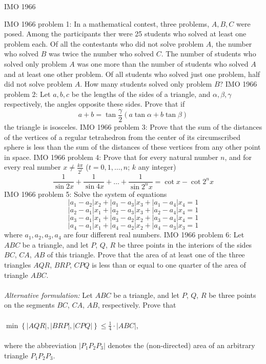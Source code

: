 IMO 1966 

IMO 1966 problem 1:  In a mathematical contest, three problems, $A,B,C$ were posed. Among the participants ther were 25 students who solved at least one problem each. Of all the contestants who did not solve problem $A$, the number who solved $B$ was twice the number who solved $C$. The number of students who solved only problem $A$ was one more than the number of students who solved $A$ and at least one other problem. Of all students who solved just one problem, half did not solve problem $A$. How many students solved only problem $B$? 
IMO 1966 problem 2:  Let $a,b,c$ be the lengths of the sides of a triangle, and $\alpha, \beta, \gamma$ respectively, the angles opposite these sides. Prove that if
\[ a+b=\tan{\frac{\gamma}{2}}(a\tan{\alpha}+b\tan{\beta}) \]
the triangle is isosceles. 
IMO 1966 problem 3:  Prove that the sum of the distances of the vertices of a regular tetrahedron from the center of its circumscribed sphere is less than the sum of the distances of these vertices from any other point in space. 
IMO 1966 problem 4:  Prove that for every natural number $n$, and for every real number $x \neq \frac{k\pi}{2^t}$ ($t=0,1, \dots, n$; $k$ any integer)
\[ \frac{1}{\sin{2x}}+\frac{1}{\sin{4x}}+\dots+\frac{1}{\sin{2^nx}}=\cot{x}-\cot{2^nx} \] 
IMO 1966 problem 5:  Solve the system of equations
\[ |a_1-a_2|x_2+|a_1-a_3|x_3+|a_1-a_4|x_4=1 \]
\[ |a_2-a_1|x_1+|a_2-a_3|x_3+|a_2-a_4|x_4=1 \]
\[ |a_3-a_1|x_1+|a_3-a_2|x_2+|a_3-a_4|x_4=1 \]
\[ |a_4-a_1|x_1+|a_4-a_2|x_2+|a_4-a_3|x_3=1 \]
where $a_1, a_2, a_3, a_4$ are four different real numbers. 
IMO 1966 problem 6:  Let $ ABC$ be a triangle, and let $ P$, $ Q$, $ R$ be three points in the interiors of the sides $ BC$, $ CA$, $ AB$ of this triangle. Prove that the area of at least one of the three triangles $ AQR$, $ BRP$, $ CPQ$ is less than or equal to one quarter of the area of triangle $ ABC$. \\\\
\textit{Alternative formulation:} Let $ ABC$ be a triangle, and let $ P$, $ Q$, $ R$ be three points on the segments $ BC$, $ CA$, $ AB$, respectively. Prove that \\\\
$ \min\left\{\left|AQR\right|,\left|BRP\right|,\left|CPQ\right|\right\}\leq\frac14\cdot\left|ABC\right|$, \\\\
where the abbreviation $ \left|P_1P_2P_3\right|$ denotes the (non-directed) area of an arbitrary triangle $ P_1P_2P_3$. 


